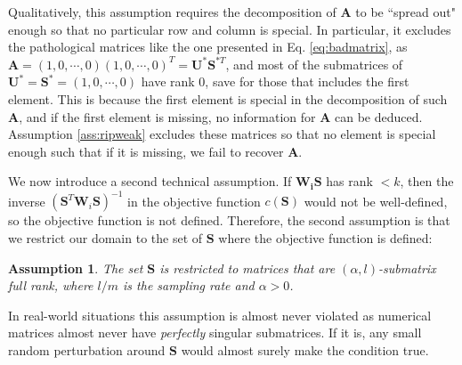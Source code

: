 \documentclass[twoside,11pt]{article}
\newtheorem{assumption}{Assumption}
\begin{document}
Qualitatively, this assumption requires the decomposition of $\bm{A}$ to be ``spread out" enough so that no particular row and column is special. In particular, it excludes the pathological matrices like the one presented in Eq. \eqref{eq:badmatrix}, as $\bm{A}=(1,0,\cdots,0)(1,0,\cdots,0)^T=\bm{U}^*\bm{S}^{*T}$, and most of the submatrices of $\bm{U}^*=\bm{S}^*=(1,0,\cdots,0)$ have rank 0, save for those that includes the first element. This is because the first element is special in the decomposition of such $\bm{A}$, and if the first element is missing, no information for $\bm{A}$ can be deduced.  Assumption \ref{ass:ripweak} excludes these matrices so that no element is special enough such that if it is missing, we fail to recover $\bm{A}$. 

We now introduce a second technical assumption. If $\bm{W_i}\bm{S}$ has rank $<k$, then the inverse $(\bm{S}^T\bm{W}_i\bm{S})^{-1}$ in the objective function $c(\bm{S})$ would not be well-defined, so the objective function is not defined. Therefore, the second assumption is that we restrict our domain to the set of $\bm{S}$ where the objective function is defined:
\begin{assumption}
\label{ass:Vrestrict}
The set $\bm{S}$ is restricted to matrices that are  $(\alpha, l)$-submatrix full rank, where $l/m$  is the sampling rate and  $\alpha>0$. 
\end{assumption}
In real-world situations this assumption is almost never violated as numerical matrices almost never have \emph{perfectly} singular submatrices. If it is, any small random perturbation around $\bm{S}$ would almost surely make the condition true. 
\end{document}
